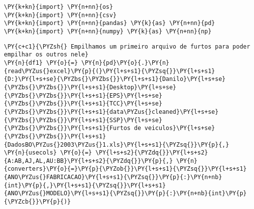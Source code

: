 \begin{tcolorbox}[breakable, size=fbox, boxrule=1pt, pad at break*=1mm,colback=cellbackground, colframe=cellborder]
\begin{Verbatim}[commandchars=\\\{\}]
\PY{k+kn}{import} \PY{n+nn}{os}
\PY{k+kn}{import} \PY{n+nn}{csv}
\PY{k+kn}{import} \PY{n+nn}{pandas} \PY{k}{as} \PY{n+nn}{pd}
\PY{k+kn}{import} \PY{n+nn}{numpy} \PY{k}{as} \PY{n+nn}{np}
\end{Verbatim}
\end{tcolorbox}

    \begin{tcolorbox}[breakable, size=fbox, boxrule=1pt, pad at break*=1mm,colback=cellbackground, colframe=cellborder]
\begin{Verbatim}[commandchars=\\\{\}]
\PY{c+c1}{\PYZsh{} Empilhamos um primeiro arquivo de furtos para poder empilhar os outros nele}
\PY{n}{df1} \PY{o}{=} \PY{n}{pd}\PY{o}{.}\PY{n}{read\PYZus{}excel}\PY{p}{(}\PY{l+s+s1}{\PYZsq{}}\PY{l+s+s1}{D:}\PY{l+s+se}{\PYZbs{}\PYZbs{}}\PY{l+s+s1}{Danilo}\PY{l+s+se}{\PYZbs{}\PYZbs{}}\PY{l+s+s1}{Desktop}\PY{l+s+se}{\PYZbs{}\PYZbs{}}\PY{l+s+s1}{EPS}\PY{l+s+se}{\PYZbs{}\PYZbs{}}\PY{l+s+s1}{TCC}\PY{l+s+se}{\PYZbs{}\PYZbs{}}\PY{l+s+s1}{data\PYZus{}cleaned}\PY{l+s+se}{\PYZbs{}\PYZbs{}}\PY{l+s+s1}{SSP}\PY{l+s+se}{\PYZbs{}\PYZbs{}}\PY{l+s+s1}{Furtos de veiculos}\PY{l+s+se}{\PYZbs{}\PYZbs{}}\PY{l+s+s1}{DadosBO\PYZus{}2003\PYZus{}1.xls}\PY{l+s+s1}{\PYZsq{}}\PY{p}{,} \PY{n}{usecols} \PY{o}{=} \PY{l+s+s2}{\PYZdq{}}\PY{l+s+s2}{A:AB,AJ,AL,AU:BB}\PY{l+s+s2}{\PYZdq{}}\PY{p}{,} \PY{n}{converters}\PY{o}{=}\PY{p}{\PYZob{}}\PY{l+s+s1}{\PYZsq{}}\PY{l+s+s1}{ANO\PYZus{}FABRICACAO}\PY{l+s+s1}{\PYZsq{}}\PY{p}{:}\PY{n+nb}{int}\PY{p}{,}\PY{l+s+s1}{\PYZsq{}}\PY{l+s+s1}{ANO\PYZus{}MODELO}\PY{l+s+s1}{\PYZsq{}}\PY{p}{:}\PY{n+nb}{int}\PY{p}{\PYZcb{}}\PY{p}{)}
\end{Verbatim}
\end{tcolorbox}


